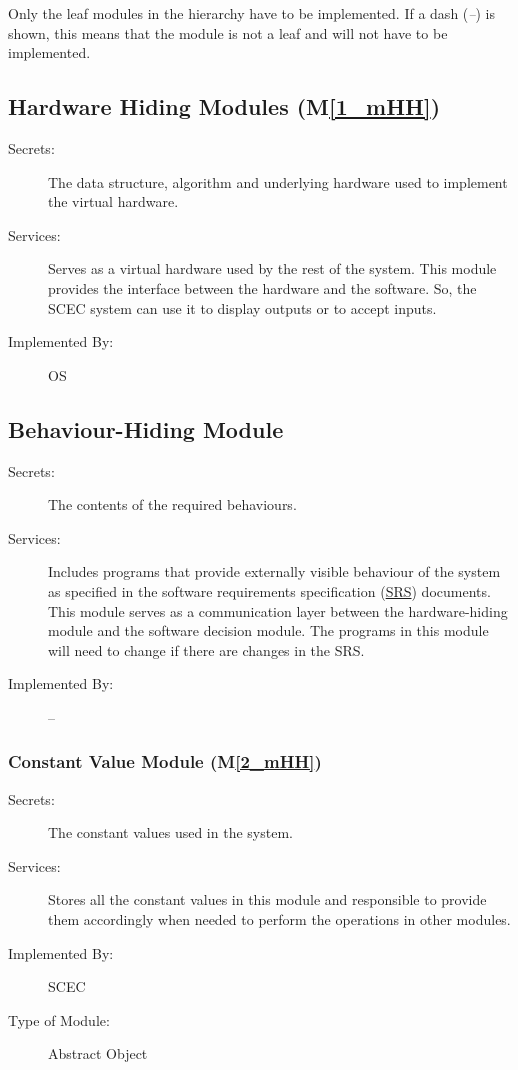 \documentclass[12pt, titlepage]{article}
\newcommand{\mref}[1]{M\ref{#1}}
\begin{document}
Only the leaf modules in the hierarchy have to be implemented. If a dash
(\emph{--}) is shown, this means that the module is not a leaf and will not have
to be implemented.

\subsection{Hardware Hiding Modules (\mref{1_mHH})}

\begin{description}
\item[Secrets:]The data structure, algorithm and underlying hardware used to implement the virtual hardware.
\item[Services:]Serves as a virtual hardware used by the rest of the
  system. This module provides the interface between the hardware and the software. So, the SCEC system can use it to display outputs or to accept inputs.
\item[Implemented By:] OS
\end{description}

\subsection{Behaviour-Hiding Module}

\begin{description}
\item[Secrets:]The contents of the required behaviours.
\item[Services:]Includes programs that provide externally visible behaviour of
  the system as specified in the software requirements specification (\href{https://github.com/DeeshaPatel/CAS-741-Solar-Cooker/blob/2a6c0175891c01960d83cb99b73a762a9b2d2508/docs/SRS/SRS.pdf}{SRS})
  documents. This module serves as a communication layer between the
  hardware-hiding module and the software decision module. The programs in this
  module will need to change if there are changes in the SRS.
\item[Implemented By:] --
\end{description}

\subsubsection{Constant Value Module (\mref{2_mHH})}

\begin{description}
\item[Secrets:] The constant values used in the system. 
\item[Services:] Stores all the constant values in this module and responsible to provide them accordingly when needed to perform the operations in other modules. 
\item[Implemented By:] SCEC
\item[Type of Module:] Abstract Object 
\end{description}
\end{document}
